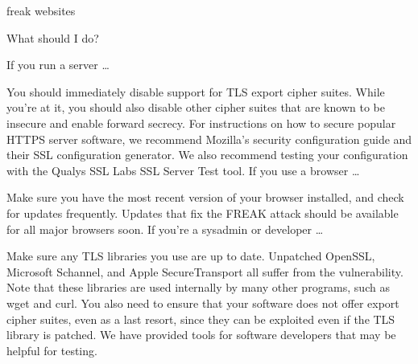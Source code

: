 freak websites 

What should I do?

If you run a server …

You should immediately disable support for TLS export cipher suites. While you’re at it, you should also disable other cipher suites that are known to be insecure and enable forward secrecy. For instructions on how to secure popular HTTPS server software, we recommend Mozilla’s security configuration guide and their SSL configuration generator. We also recommend testing your configuration with the Qualys SSL Labs SSL Server Test tool.
If you use a browser …

Make sure you have the most recent version of your browser installed, and check for updates frequently. Updates that fix the FREAK attack should be available for all major browsers soon.
If you’re a sysadmin or developer …

Make sure any TLS libraries you use are up to date. Unpatched OpenSSL, Microsoft Schannel, and Apple SecureTransport all suffer from the vulnerability. Note that these libraries are used internally by many other programs, such as wget and curl. You also need to ensure that your software does not offer export cipher suites, even as a last resort, since they can be exploited even if the TLS library is patched. We have provided tools for software developers that may be helpful for testing.
